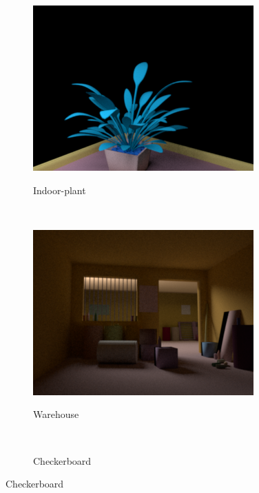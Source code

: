\documentclass{jov}
\begin{document}
\begin{figure}[t]
    \begin{subfigure}[b]{0.22 \textwidth}
        \caption{Indoor-plant}    
        \includegraphics[width=\textwidth]{../FiguresDraft4/Figure3/Figure3_d.png}
        \label{fig:baseSceneIndoorPlant}
    \end{subfigure}    
    ~
    \begin{subfigure}[b]{0.22 \textwidth}
        \caption{Warehouse}    
        \includegraphics[width=\textwidth]{../FiguresDraft4/Figure3/Figure3_e.png}
        \label{fig:baseSceneWarehouse}
    \end{subfigure}
    ~
    \begin{subfigure}[b]{0.22 \textwidth}
        \caption{Checkerboard}    

\end{subfigure}
\end{figure}
\end{document}
